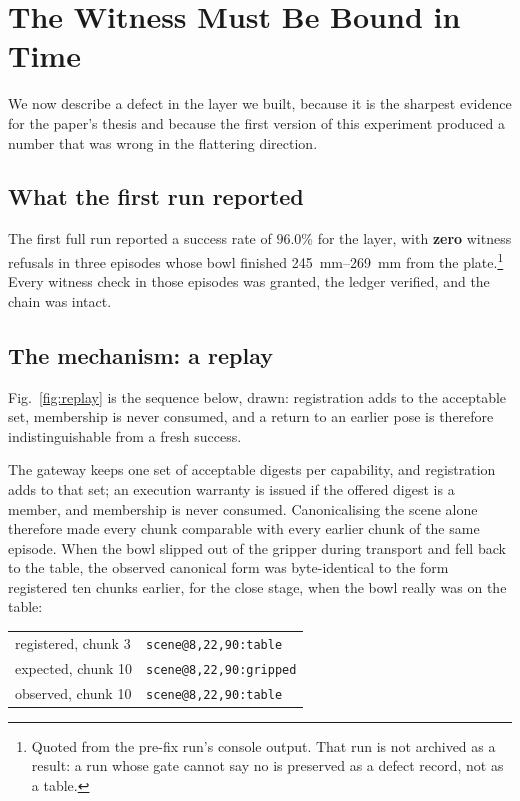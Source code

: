 \documentclass[conference]{IEEEtran}
\theoremstyle{definition}
\begin{document}
\section{The Witness Must Be Bound in Time}
\label{sec:err004}

We now describe a defect in the layer we built, because it is the sharpest
evidence for the paper's thesis and because the first version of this
experiment produced a number that was wrong in the flattering direction.

\subsection{What the first run reported}

The first full run reported a success rate of $96.0\%$ for the layer, with
\textbf{zero} witness refusals in three episodes whose bowl finished
\SIrange{245}{269}{mm} from the plate.\footnote{Quoted from the pre-fix run's
console output. That run is not archived as a result: a run whose gate cannot
say no is preserved as a defect record, not as a table.} Every witness check in
those episodes was granted, the ledger verified, and the chain was intact.

\subsection{The mechanism: a replay}

Fig.~\ref{fig:replay} is the sequence below, drawn: registration adds to the
acceptable set, membership is never consumed, and a return to an earlier pose is
therefore indistinguishable from a fresh success.

The gateway keeps one set of acceptable digests per capability, and
registration adds to that set; an execution warranty is issued if the offered digest is a
member, and membership is never consumed. Canonicalising the scene alone
therefore made every chunk comparable with every earlier chunk of the same
episode. When the bowl slipped out of the gripper during transport and fell
back to the table, the observed canonical form was byte-identical to the form
registered ten chunks earlier, for the \textsf{close} stage, when the bowl
really was on the table:

\begin{center}
\small\ttfamily
\begin{tabular}{@{}ll@{}}
registered, chunk 3 & \texttt{scene@8,22,90:table}\\
expected,   chunk 10 & \texttt{scene@8,22,90:gripped}\\
observed,   chunk 10 & \texttt{scene@8,22,90:table}\\
\end{tabular}
\end{center}
\end{document}
